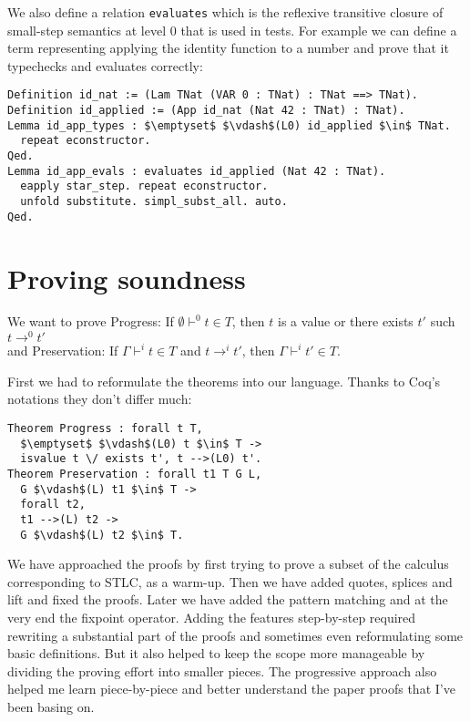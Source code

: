\documentclass[runningheads]{article}
\begin{document}
We also define a relation \texttt{evaluates} which is the reflexive transitive closure of small-step semantics at level 0 that is used in tests. For example we can define a term representing applying the identity function to a number and prove that it typechecks and evaluates correctly:
\begin{lstlisting}[mathescape=true]
Definition id_nat := (Lam TNat (VAR 0 : TNat) : TNat ==> TNat).
Definition id_applied := (App id_nat (Nat 42 : TNat) : TNat).
Lemma id_app_types : $\emptyset$ $\vdash$(L0) id_applied $\in$ TNat.
  repeat econstructor.
Qed.
Lemma id_app_evals : evaluates id_applied (Nat 42 : TNat).
  eapply star_step. repeat econstructor.
  unfold substitute. simpl_subst_all. auto.
Qed.
\end{lstlisting}



\section{Proving soundness}
\label{sec:proving}
We want to prove Progress: If $\emptyset \vdash^0 t \in T$, then $t$ is a value or there exists $t'$ such $t \longrightarrow^0 t'$
\\
and Preservation: If $\Gamma \vdash^i t \in T$ and $t \longrightarrow^i t'$, then $\Gamma \vdash^i t' \in T$.


First we had to reformulate the theorems into our language. Thanks to Coq's notations they don't differ much:
\begin{lstlisting}[mathescape=true]
Theorem Progress : forall t T,
  $\emptyset$ $\vdash$(L0) t $\in$ T ->
  isvalue t \/ exists t', t -->(L0) t'.
Theorem Preservation : forall t1 T G L,
  G $\vdash$(L) t1 $\in$ T ->
  forall t2,
  t1 -->(L) t2 ->
  G $\vdash$(L) t2 $\in$ T.
\end{lstlisting}

We have approached the proofs by first trying to prove a subset of the calculus corresponding to STLC, as a warm-up. Then we have added quotes, splices and lift and fixed the proofs. Later we have added the pattern matching and at the very end the fixpoint operator. Adding the features step-by-step required rewriting a substantial part of the proofs and sometimes even reformulating some basic definitions. But it also helped to keep the scope more manageable by dividing the proving effort into smaller pieces. The progressive approach also helped me learn piece-by-piece and better understand the paper proofs that I've been basing on.
\end{document}
